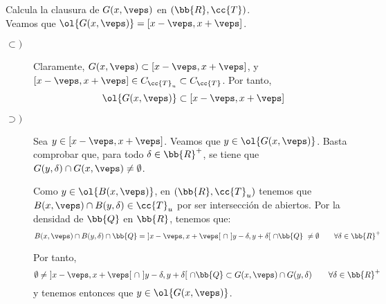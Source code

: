 \documentclass[12pt]{article}
\newcommand{\T}[0]{\cc{T}}
\begin{document}
    \begin{ejercicio}[1 punto]
        Calcula la clausura de $G(x,\veps)$ en $(\bb{R},\T)$.\\

        Veamos que $\ol{G(x,\veps)}=[x-\veps, x+\veps]$.
        \begin{description}
            \item[$\subset)$] Claramente, $G(x,\veps)\subset [x-\veps, x+\veps]$,
            y $[x-\veps, x+\veps]\in C_{\T_u}\subset C_{\T}$. Por tanto,
            \begin{equation*}
                \ol{G(x,\veps)}\subset [x-\veps, x+\veps]
            \end{equation*}
            
            \item[$\supset)$] Sea $y\in [x-\veps, x+\veps]$. Veamos que $y\in \ol{G(x,\veps)}$. Basta comprobar
            que, para todo $\delta\in \bb{R}^+$, se tiene que $G(y,\delta)\cap G(x,\veps)\neq \emptyset$.

            Como $y\in \ol{B(x,\veps)}$, en $(\bb{R},\T_u)$ tenemos que $B(x,\veps)\cap B(y,\delta)\in \T_u$ por ser intersección de abiertos.
            Por la densidad de $\bb{Q}$ en $\bb{R}$, tenemos que:
            \begin{equation*}
                B(x,\veps)\cap B(y,\delta)\cap \bb{Q} =~ ]x-\veps,x+\veps[~\cap~]y-\delta,y+\delta[~\cap \bb{Q}~\neq \emptyset
                \qquad \forall \delta\in \bb{R}^+
            \end{equation*}

            Por tanto,
            \begin{equation*}
                \emptyset \neq ~]x-\veps,x+\veps[~\cap~]y-\delta,y+\delta[~\cap \bb{Q} \subset G(x,\veps)\cap G(y,\delta)
                \qquad \forall \delta\in \bb{R}^+
            \end{equation*}
            y tenemos entonces que $y\in \ol{G(x,\veps)}$.
        \end{description}
    \end{ejercicio}
\end{document}
